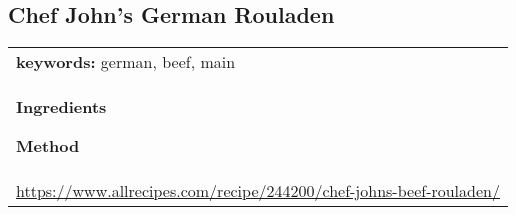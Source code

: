 \documentclass[../web-recipes.tex]{subfiles}
\begin{document}
    \renewcommand{\mytitle}{Chef John's German Rouladen}
    \renewcommand{\myurl}{https://www.allrecipes.com/recipe/244200/chef-johns-beef-rouladen/}
    \begin{mdframed}[nobreak]
      \section{\mytitle}
      \begin{tabular}{l}
      {\sffamily\footnotesize \textbf{keywords:}
        german, beef, main
      } \vspace{0.5ex}\\
        \begin{minipage}[t]{0.35\textwidth}
          {\sffamily\bfseries Ingredients}\vspace{0.5ex}
          
        \end{minipage}
        \qquad
        \begin{minipage}[t]{0.55\textwidth}
          {\sffamily\bfseries Method}\vspace{0.5ex}
          
        \end{minipage} \vspace{3ex}\\
        \multicolumn{1}{c}{\small\ttfamily \url{\myurl}} \\
      \end{tabular}
    \end{mdframed}
    
\end{document}

